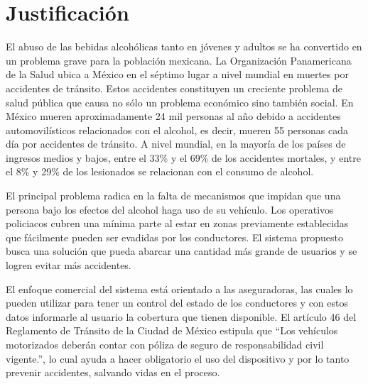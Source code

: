 \section{Justificación}
El abuso de las bebidas alcohólicas tanto en jóvenes y adultos se ha convertido en un problema grave para la población mexicana. La Organización Panamericana de la Salud ubica a México en el séptimo lugar a nivel mundial en muertes por accidentes de tránsito. Estos accidentes constituyen un creciente problema de salud pública que causa no sólo un problema económico sino también social. En México mueren aproximadamente 24 mil personas al año debido a accidentes automovilísticos relacionados con el alcohol, es decir, mueren 55 personas cada día por accidentes de tránsito. A nivel mundial, en la mayoría de los países de ingresos medios y bajos, entre el 33\% y el 69\% de los accidentes mortales, y entre el 8\% y 29\% de los lesionados se relacionan con el consumo de alcohol. \cite{beber_y_conducir} \par
El principal problema radica en la falta de mecanismos que impidan que una persona bajo los efectos del alcohol haga uso de su vehículo. Los operativos policiacos cubren una mínima parte al estar en zonas previamente establecidas que fácilmente pueden ser evadidas por los conductores. El sistema propuesto busca una solución que pueda abarcar una cantidad más grande de usuarios y se logren evitar más accidentes. \par
El enfoque comercial del sistema está orientado a las aseguradoras, las cuales lo pueden utilizar para tener un control del estado de los conductores y con estos datos informarle al usuario la cobertura que tienen disponible. El artículo 46 del Reglamento de Tránsito de la Ciudad de México estipula que “Los vehículos motorizados deberán contar con póliza de seguro de responsabilidad civil vigente.”, lo cual ayuda a hacer obligatorio el uso del dispositivo y por lo tanto prevenir accidentes, salvando vidas en el proceso. \cite{reglamento_de_transito}